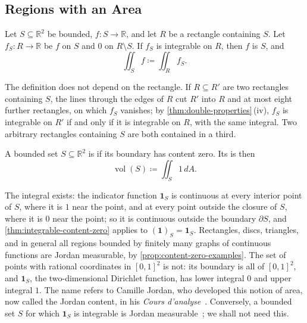 \subsection{Regions with an Area}

\begin{definition}
\label{def:integral-over-set}
Let $S\subseteq\mathbb R^2$ be bounded, $f\colon S\to\mathbb R$, and let $R$ be a rectangle containing $S$. Let $f_S\colon R\to\mathbb R$ be $f$ on $S$ and $0$ on $R\setminus S$. If $f_S$ is integrable on $R$, then $f$ is  $S$, and
\[
\iint_Sf\coloneqq\iint_Rf_S .
\]
\end{definition}

The definition does not depend on the rectangle. If $R\subseteq R'$ are two rectangles containing $S$, the lines through the edges of $R$ cut $R'$ into $R$ and at most eight further rectangles, on which $f_S$ vanishes; by \cref{thm:double-properties}\,(iv), $f_S$ is integrable on $R'$ if and only if it is integrable on $R$, with the same integral. Two arbitrary rectangles containing $S$ are both contained in a third.

\begin{definition}
\label{def:jordan-measurable}
A bounded set $S\subseteq\mathbb R^2$ is  if its boundary has content zero. Its  is then
\[
\operatorname{vol}(S)\coloneqq\iint_S1\,dA .
\]
\end{definition}

The integral exists: the indicator function $\mathbf 1_S$ is continuous at every interior point of $S$, where it is $1$ near the point, and at every point outside the closure of $S$, where it is $0$ near the point; so it is continuous outside the boundary $\partial S$, and \cref{thm:integrable-content-zero} applies to $(\mathbf 1)_S=\mathbf 1_S$. Rectangles, discs, triangles, and in general all regions bounded by finitely many graphs of continuous functions are Jordan measurable, by \cref{prop:content-zero-examples}. The set of points with rational coordinates in $[0,1]^2$ is not: its boundary is all of $[0,1]^2$, and $\mathbf 1_S$, the two-dimensional Dirichlet function, has lower integral $0$ and upper integral $1$. The name refers to Camille Jordan, who developed this notion of area, now called the Jordan content, in his \emph{Cours d'analyse}~\cite{jordan1893,hawkins1975}. Conversely, a bounded set $S$ for which $\mathbf 1_S$ is integrable is Jordan measurable~\cite{munkres1991}; we shall not need this.

